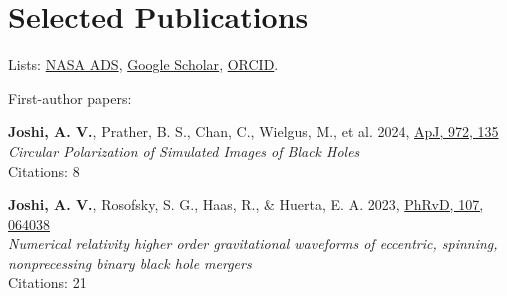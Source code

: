 \documentclass[11pt]{article}
\begin{document}
\section*{Selected Publications}
Lists: \href{\adslibrary}{NASA ADS}, \href{\googlescholar}{Google Scholar}, \href{https://orcid.org/0000-0002-2514-5965}{ORCID}.


% 

First-author papers:
\begin{etaremune}

    \item \textbf{Joshi, A. V.}, Prather, B. S., Chan, C., Wielgus, M., et al. 2024, \href{https://ui.adsabs.harvard.edu/abs/2024ApJ...972..135J}{ApJ, 972, 135}\\\textit{Circular Polarization of Simulated Images of Black Holes}\\Citations: 8

    \item \textbf{Joshi, A. V.}, Rosofsky, S. G., Haas, R., \& Huerta, E. A. 2023, \href{https://ui.adsabs.harvard.edu/abs/2023PhRvD.107f4038J}{PhRvD, 107, 064038}\\\textit{Numerical relativity higher order gravitational waveforms of eccentric, spinning, nonprecessing binary black hole mergers}\\Citations: 21

\end{etaremune}
\end{document}
